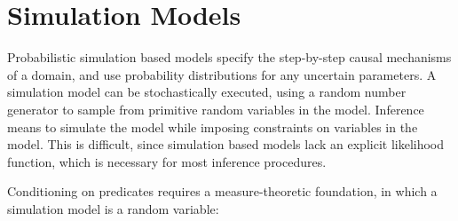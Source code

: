 
\section{Simulation Models}\label{simmodels}




Probabilistic simulation based models specify the step-by-step causal mechanisms of a domain, and use probability distributions for any uncertain parameters.
A simulation model can be stochastically executed, using a random number generator to sample from primitive random variables in the model.
Inference means to simulate the model while imposing constraints on variables in the model.
This is difficult, since simulation based models lack an explicit likelihood function, which is necessary for most inference procedures.

Conditioning on predicates requires a measure-theoretic foundation, in which a simulation model is a random variable:

